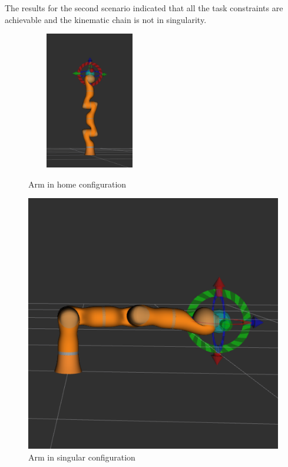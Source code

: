The results for the second scenario indicated that all the task constraints are achievable and the kinematic chain is not in singularity.


\begin{figure}[h!]
		\begin{minipage}{0.35\textwidth}
			\centering
			\includegraphics[width=5.5cm,height=6cm]{images/kukaconfiguration3}
			\caption{Arm in home configuration}
			\label{singular1}
		\end{minipage}\hfill
			\begin{minipage}{0.35\textwidth}
				\centering
				\includegraphics[scale=0.34]{images/kukac4}
				\caption{Arm in singular configuration}
				\label{singular2}
			\end{minipage}
\end{figure} 
